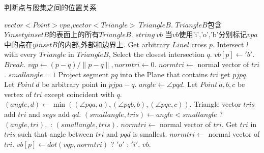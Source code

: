 \documentclass[a4paper]{book}
\renewcommand{\algorithmicrequire}{\textbf{输入:}}
\renewcommand{\algorithmicensure}{\textbf{输出:}}
\renewcommand{\algorithmicrequire}{\textbf{Input : }}
\renewcommand{\algorithmicrequire}{\textbf{Precondition : }}
\renewcommand{\algorithmicensure}{\textbf{Output : }}
\renewcommand{\algorithmicensure}{\textbf{Postcondition : }}
\numberwithin{equation}{chapter}
\theoremstyle{definition}
\begin{document}
\begin{algorithm}
	\caption{判断点与殷集之间的位置关系}
	\begin{algorithmic}[1]
		\renewcommand{\algorithmicrequire}{\textbf{Input : }}
		\Require $vector<Point> vpa $,$vector<Triangle>\ TriangleB$.
		\renewcommand{\algorithmicrequire}{\textbf{Precondition : }}
		\Require $TriangleB$包含$Yinset yinsetB$的表面上的所有$TriangleB$.
		\renewcommand{\algorithmicensure}{\textbf{Output : }}
		\Ensure $string\ vb$
		\renewcommand{\algorithmicensure}{\textbf{Postcondition : }}
		\Ensure 当$vb$使用'i','o','b'分别标记$vpa$中的点在$yinsetB$的内部,外部和边界上.
		\State Get arbitrary $Line l$ cross $p$.
		\State Intersect $l$ with every $Triangle$ in $TriangleB$, 
		Select the closest intersection $q$.
		\State $vb[p] \gets 'b'$.
		\State $Break$.
		\EndIf
		\State $vqp \gets (p - q)/ \lVert p - q \rVert,normtri \gets 0$.
		\State $normtri \gets$ normal vector of $tri$.
		\Else
		\State $smallangle = 1$
		\State Project segment $pq$ into the Plane that contains $tri$ get $pjpq$.
		\State Let $Point \ d$ be arbitrary point in $pjpa - q$.
		\State $angle \gets \angle pqd$.
		\Else
		\State Let $Point\ a,b,c$ be vertex of $tri$ except coincident with $q$.
		\State $(angle,d) \gets \min((\angle pqa,a), (\angle pqb,b), (\angle pqc,c))$.
		\EndIf
		\State Triangle vector $tris$ add $tri$ and $segs$ add $qd$.
		\EndIf
		\State $(smallangle,tris) \gets angle < smallangle $ ? $ (angle,tri), $ : $ (smallangle,tris)$.
		\EndFor
		\State  $normtri \gets$ normal vector of $tri$.
		\Else
		\State Get $tri$ in $tris$ such that angle between $tri$ and $pqd$ is smallest.
		\State $normtri \gets$ normal vector of $tri$.
		\EndIf
		\EndIf
		\State $vb[p] \gets dot(vqp,normtri) $ ? $ 'o' $ : $ 'i' $.
		\EndFor
		\State \Return $vb$.
		\EndFunction
	\end{algorithmic}
\end{algorithm}
\end{document}
